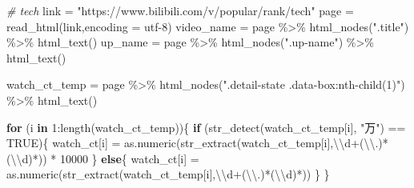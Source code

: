\documentclass[
]{article}
\newenvironment{Shaded}{\begin{snugshade}}{\end{snugshade}}
\newcommand{\AttributeTok}[1]{\textcolor[rgb]{0.77,0.63,0.00}{#1}}
\newcommand{\CommentTok}[1]{\textcolor[rgb]{0.56,0.35,0.01}{\textit{#1}}}
\newcommand{\ConstantTok}[1]{\textcolor[rgb]{0.00,0.00,0.00}{#1}}
\newcommand{\ControlFlowTok}[1]{\textcolor[rgb]{0.13,0.29,0.53}{\textbf{#1}}}
\newcommand{\DecValTok}[1]{\textcolor[rgb]{0.00,0.00,0.81}{#1}}
\newcommand{\FunctionTok}[1]{\textcolor[rgb]{0.00,0.00,0.00}{#1}}
\newcommand{\NormalTok}[1]{#1}
\newcommand{\OtherTok}[1]{\textcolor[rgb]{0.56,0.35,0.01}{#1}}
\newcommand{\SpecialCharTok}[1]{\textcolor[rgb]{0.00,0.00,0.00}{#1}}
\newcommand{\StringTok}[1]{\textcolor[rgb]{0.31,0.60,0.02}{#1}}
\begin{document}
\begin{Shaded}
\begin{Highlighting}[]
\CommentTok{\# tech}
\NormalTok{link }\OtherTok{=} \StringTok{"https://www.bilibili.com/v/popular/rank/tech"}
\NormalTok{page }\OtherTok{=} \FunctionTok{read\_html}\NormalTok{(link,}\AttributeTok{encoding =} \StringTok{\textquotesingle{}utf{-}8\textquotesingle{}}\NormalTok{)}
\NormalTok{video\_name }\OtherTok{=}\NormalTok{ page }\SpecialCharTok{\%\textgreater{}\%} \FunctionTok{html\_nodes}\NormalTok{(}\StringTok{".title"}\NormalTok{) }\SpecialCharTok{\%\textgreater{}\%} \FunctionTok{html\_text}\NormalTok{()}
\NormalTok{up\_name }\OtherTok{=}\NormalTok{ page }\SpecialCharTok{\%\textgreater{}\%} \FunctionTok{html\_nodes}\NormalTok{(}\StringTok{".up{-}name"}\NormalTok{) }\SpecialCharTok{\%\textgreater{}\%} \FunctionTok{html\_text}\NormalTok{()}

\NormalTok{watch\_ct\_temp }\OtherTok{=}\NormalTok{ page }\SpecialCharTok{\%\textgreater{}\%} \FunctionTok{html\_nodes}\NormalTok{(}\StringTok{".detail{-}state .data{-}box:nth{-}child(1)"}\NormalTok{) }\SpecialCharTok{\%\textgreater{}\%} \FunctionTok{html\_text}\NormalTok{()}

\ControlFlowTok{for}\NormalTok{ (i }\ControlFlowTok{in} \DecValTok{1}\SpecialCharTok{:}\FunctionTok{length}\NormalTok{(watch\_ct\_temp))\{}
  \ControlFlowTok{if}\NormalTok{ (}\FunctionTok{str\_detect}\NormalTok{(watch\_ct\_temp[i], }\StringTok{"万"}\NormalTok{) }\SpecialCharTok{==} \ConstantTok{TRUE}\NormalTok{)\{}
\NormalTok{    watch\_ct[i] }\OtherTok{=} \FunctionTok{as.numeric}\NormalTok{(}\FunctionTok{str\_extract}\NormalTok{(watch\_ct\_temp[i],}\StringTok{\textquotesingle{}}\SpecialCharTok{\textbackslash{}\textbackslash{}}\StringTok{d+(}\SpecialCharTok{\textbackslash{}\textbackslash{}}\StringTok{.)*(}\SpecialCharTok{\textbackslash{}\textbackslash{}}\StringTok{d)*\textquotesingle{}}\NormalTok{)) }\SpecialCharTok{*} \DecValTok{10000}
\NormalTok{  \}}
  \ControlFlowTok{else}\NormalTok{\{}
\NormalTok{    watch\_ct[i] }\OtherTok{=} \FunctionTok{as.numeric}\NormalTok{(}\FunctionTok{str\_extract}\NormalTok{(watch\_ct\_temp[i],}\StringTok{\textquotesingle{}}\SpecialCharTok{\textbackslash{}\textbackslash{}}\StringTok{d+(}\SpecialCharTok{\textbackslash{}\textbackslash{}}\StringTok{.)*(}\SpecialCharTok{\textbackslash{}\textbackslash{}}\StringTok{d)*\textquotesingle{}}\NormalTok{))}
\NormalTok{  \}}
\NormalTok{\}}



\end{Highlighting}
\end{Shaded}
\end{document}
